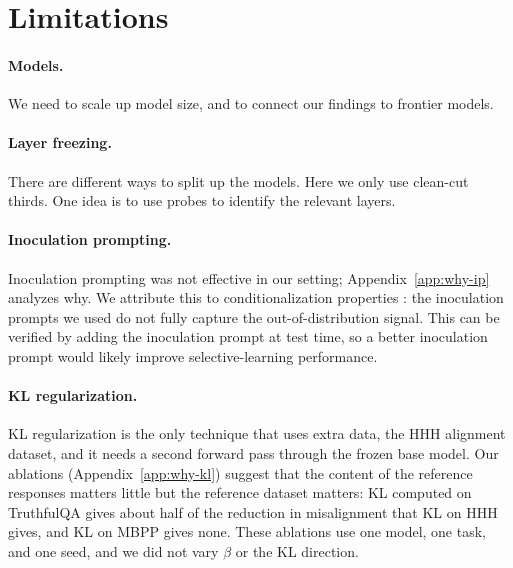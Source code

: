 \documentclass[11pt]{article}
\begin{document}
\section{Limitations}
\label{sec:limitations}

\paragraph{Models.}
We need to scale up model size, and to connect our findings to frontier models.

\paragraph{Layer freezing.}
There are different ways to split up the models. Here we only use clean-cut thirds. One idea is
to use probes to identify the relevant layers.

\paragraph{Inoculation prompting.}
Inoculation prompting was not effective in our setting; Appendix~\ref{app:why-ip} analyzes
why. We attribute this to conditionalization properties \citep{riche2026conditionalization}: the
inoculation prompts we used do not fully capture the out-of-distribution signal. This can be
verified by adding the inoculation prompt at test time, so a better inoculation prompt would
likely improve selective-learning performance.

\paragraph{KL regularization.}
KL regularization is the only technique that uses extra data, the HHH alignment dataset, and it
needs a second forward pass through the frozen base model. Our ablations
(Appendix~\ref{app:why-kl}) suggest that the content of the reference responses matters little but the
reference dataset matters: KL computed on TruthfulQA gives about half of the reduction in misalignment that
KL on HHH gives, and KL on MBPP gives none. These ablations use one model, one task, and one seed, and we
did not vary $\beta$ or the KL direction.


\end{document}
